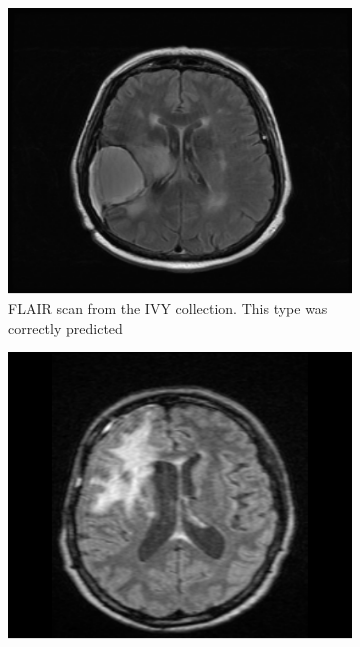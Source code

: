\begin{figure}[htbp]
\centering
    \begin{subfigure}[t]{0.25\textwidth}
        \centering
        \includegraphics[width=\textwidth]{Figures/FLAIR_Ivy}
        \caption{\gls{FLAIR} \gls{scan} from the \gls{IVY} collection. This \gls{type} was correctly predicted}\label{fig:IvyGAP_FLAIR}
    \end{subfigure}
    \hfill
    \begin{subfigure}[t]{0.25\textwidth}
        \centering
        \includegraphics[width=\textwidth]{Figures/FLAIR_RIDER}

\end{subfigure}
\end{figure}
